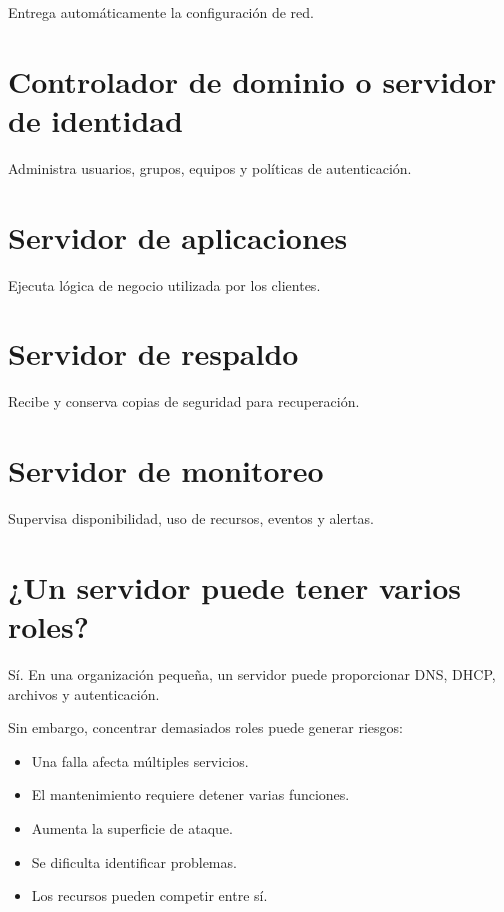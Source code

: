 \documentclass[
  spanish,
  letterpaper,
]{scrbook}
\providecommand{\tightlist}{%
  \setlength{\itemsep}{0pt}\setlength{\parskip}{0pt}}
\begin{document}
Entrega automáticamente la configuración de red.


\chapter{Controlador de dominio o servidor de
identidad}\label{controlador-de-dominio-o-servidor-de-identidad}

Administra usuarios, grupos, equipos y políticas de autenticación.


\chapter{Servidor de aplicaciones}\label{servidor-de-aplicaciones}

Ejecuta lógica de negocio utilizada por los clientes.


\chapter{Servidor de respaldo}\label{servidor-de-respaldo}

Recibe y conserva copias de seguridad para recuperación.


\chapter{Servidor de monitoreo}\label{servidor-de-monitoreo}

Supervisa disponibilidad, uso de recursos, eventos y alertas.


\chapter{¿Un servidor puede tener varios
roles?}\label{un-servidor-puede-tener-varios-roles}

Sí. En una organización pequeña, un servidor puede proporcionar DNS,
DHCP, archivos y autenticación.

Sin embargo, concentrar demasiados roles puede generar riesgos:

\begin{itemize}
\tightlist
\item
  Una falla afecta múltiples servicios.
\item
  El mantenimiento requiere detener varias funciones.
\item
  Aumenta la superficie de ataque.
\item
  Se dificulta identificar problemas.
\item
  Los recursos pueden competir entre sí.
\end{itemize}
\end{document}
